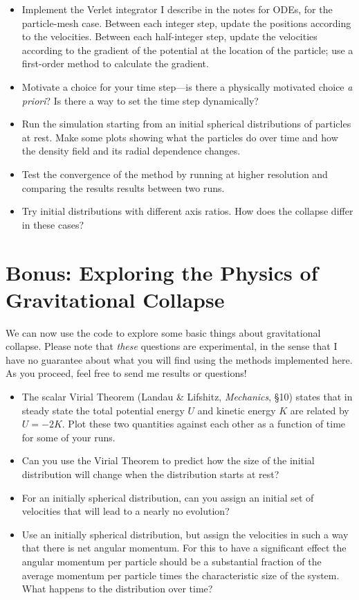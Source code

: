 \documentclass[11pt, preprint]{aastex}
\begin{document}
\begin{itemize}
\item Implement the Verlet integrator I describe in the notes for
  ODEs, for the particle-mesh case. Between each integer step,
  update the positions according to the velocities. Between each
  half-integer step, update the velocities according to the gradient
  of the potential at the location of the particle; use a first-order
  method to calculate the gradient. 
\item Motivate a choice for your time step---is there a physically
  motivated choice {\it a priori}? Is there a way to set the time step
  dynamically? 
\item Run the simulation starting from an initial spherical
  distributions of particles at rest. Make some plots showing what the
  particles do over time and how the density field and its radial
  dependence changes. 
\item Test the convergence of the method by running at higher
  resolution and comparing the results results between two runs.
\item Try initial distributions with different axis ratios. How does
  the collapse differ in these cases?
\end{itemize}

\section{Bonus: Exploring the Physics of Gravitational Collapse}

We can now use the code to explore some basic things about
gravitational collapse. Please note that {\it these} questions are
experimental, in the sense that I have no guarantee about what you
will find using the methods implemented here. As you proceed, feel
free to send me results or questions!

\begin{itemize}  
\item The scalar Virial Theorem (Landau \& Lifshitz, {\it Mechanics},
  \S10) states that in steady state the total potential energy $U$ and
  kinetic energy $K$ are related by $U = -2K$. Plot these two
  quantities against each other as a function of time for some of your
  runs.
\item Can you use the Virial Theorem to predict how the size of the
  initial distribution will change when the distribution starts at
  rest?
\item For an initially spherical distribution, can you assign an
  initial set of velocities that will lead to a nearly no evolution? 
\item Use an initially spherical distribution, but assign the
  velocities in such a way that there is net angular momentum. For
  this to have a significant effect the angular momentum per particle
  should be a substantial fraction of the average momentum per
  particle times the characteristic size of the system. What happens
  to the distribution over time?
\end{itemize}
\end{document}
